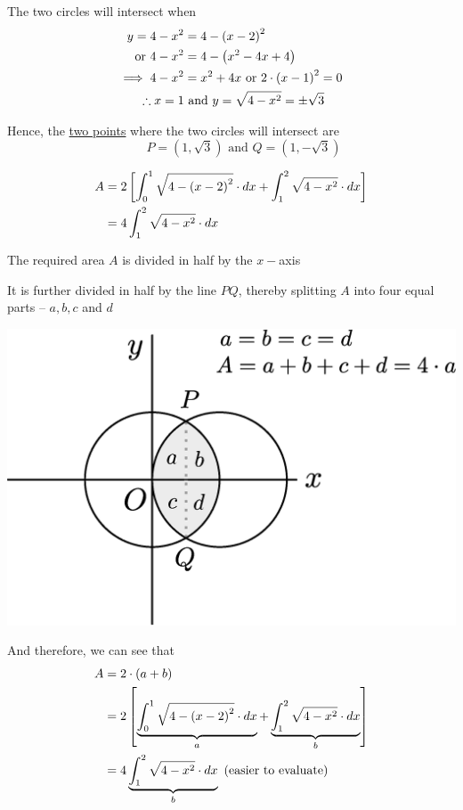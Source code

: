 \documentclass[14pt,fleqn]{extarticle}
\begin{document}
\newcard 

The two circles will intersect when 
\begin{align}
	y = 4-x^2 &= 4- \left(x-2 \right)^2 \\
	\text{or } 4-x^2 &= 4 - \left(x^2- 4x + 4 \right) \\
	\implies 4-x^2 &= x^2 + 4x \text{ or } 2\cdot \left(x-1 \right)^2 = 0 \\
	\therefore x = 1&\text{ and } y = \sqrt{4-x^2} = \pm \sqrt{3} 
\end{align}

Hence, the \underline{two points} where the two circles will intersect are 
\[ \qquad P = \left(1,\sqrt{3} \right)\text{ and } Q = \left(1,-\sqrt{3} \right)\]

\newcard

\smallmath 
\begin{align}
A &= 2 \left[\int_0^1 \sqrt{4- \left(x-2 \right)^2}\cdot dx + \int_1^2 \sqrt{4-x^2}\cdot dx  \right] \\
&= 4\int_1^2 \sqrt{4-x^2}\cdot dx 
\end{align}

\newcard

The required area $A$ is divided in half by the $x-$axis \newline 

It is further divided in half by the line $PQ$, thereby splitting $A$ into 
four equal parts -- $a,b,c$ and $d$ \newline 

\begin{center}
\includegraphics[scale=0.35]{fig-2.eps} 
\end{center} 

And therefore, we can see that 
\smallmath
\begin{align}
A &= 2\cdot \left(a+b \right) \\
&= 2 \left[\underbrace{\int_0^1 \sqrt{4- \left(x-2 \right)^2}\cdot dx}_{a} + \underbrace{\int_1^2 \sqrt{4-x^2}\cdot dx}_{b} \right] \\
&= 4 \underbrace{\int_1^2 \sqrt{4-x^2}\cdot dx}_{b} \text{ (easier to evaluate)}
\end{align}
\end{document}
